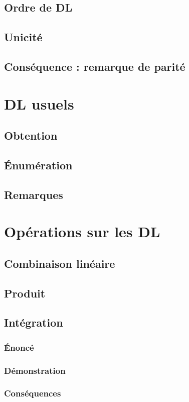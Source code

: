 \documentclass[12pt,a4paper,french]{book}
\begin{document}
		\subsection{Ordre de DL}
		\subsection{Unicité}
		\subsection{Conséquence : remarque de parité}
	\section{DL usuels}
		\subsection{Obtention}
		\subsection{Énumération}
		\subsection{Remarques}
	\section{Opérations sur les DL}
		\subsection{Combinaison linéaire}
		\subsection{Produit}
		\subsection{Intégration}
			\subsubsection{Énoncé}
			\subsubsection{Démonstration}
			\subsubsection{Conséquences}
\end{document}
